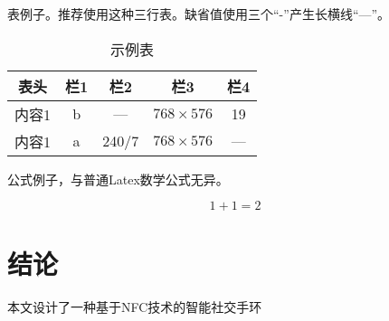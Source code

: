 表例子。推荐使用这种三行表。缺省值使用三个“-”产生长横线“---”。

\begin{table}[!t]
\caption{示例表}
\label{tab:eg}
\vspace{0.5em}
\centering
\wuhao
  \begin{tabular}{ccccc}
  \toprule[1.5pt]
  表头 & 栏1 & 栏2 & 栏3 & 栏4 \\
  \midrule[1pt]
  内容1 & b & --- & $768 \times 576$ & 19 \\
  内容1 & a & 240/7 & $768 \times 576$ & --- \\
  \bottomrule[1.5pt]
  \end{tabular}
\end{table}

公式例子，与普通Latex数学公式无异。

\begin{equation}
1+1=2
\end{equation}







\chapter*{结论}
本文设计了一种基于NFC技术的智能社交手环

 